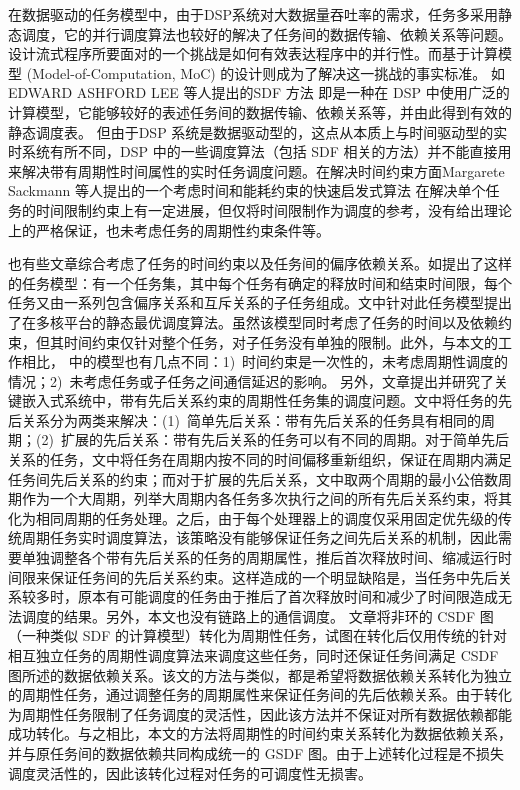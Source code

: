 在数据驱动的任务模型中，由于DSP系统对大数据量吞吐率的需求，任务多采用静态调度，它的并行调度算法也较好的解决了任务间的数据传输、依赖关系等问题。设计流式程序所要面对的一个挑战是如何有效表达程序中的并行性。而基于计算模型 (Model-of-Computation, MoC) 的设计则成为了解决这一挑战的事实标准。%
如EDWARD ASHFORD LEE 等人提出的SDF 方法 即是一种在 DSP 中使用广泛的计算模型，它能够较好的表述任务间的数据传输、依赖关系等，并由此得到有效的静态调度表。 但由于DSP 系统是数据驱动型的，这点从本质上与时间驱动型的实时系统有所不同，DSP 中的一些调度算法（包括 SDF 相关的方法）并不能直接用来解决带有周期性时间属性的实时任务调度问题。在解决时间约束方面Margarete Sackmann 等人提出的一个考虑时间和能耗约束的快速启发式算法 在解决单个任务的时间限制约束上有一定进展，但仅将时间限制作为调度的参考，没有给出理论上的严格保证，也未考虑任务的周期性约束条件等。

也有些文章综合考虑了任务的时间约束以及任务间的偏序依赖关系。如\cite{Xujia1993}提出了这样的任务模型：有一个任务集，其中每个任务有确定的释放时间和结束时间限，每个任务又由一系列包含偏序关系和互斥关系的子任务组成。文中针对此任务模型提出了在多核平台的静态最优调度算法。虽然该模型同时考虑了任务的时间以及依赖约束，但其时间约束仅针对整个任务，对子任务没有单独的限制。此外，与本文的工作相比，\cite{Xujia1993} 中的模型也有几点不同：1)~时间约束是一次性的，未考虑周期性调度的情况；2)~未考虑任务或子任务之间通信延迟的影响。
另外，文章\cite{Without}提出并研究了关键嵌入式系统中，带有先后关系约束的周期性任务集的调度问题。文中将任务的先后关系分为两类来解决：(1)~简单先后关系：带有先后关系的任务具有相同的周期；(2)~扩展的先后关系：带有先后关系的任务可以有不同的周期。对于简单先后关系的任务，文中将任务在周期内按不同的时间偏移重新组织，保证在周期内满足任务间先后关系的约束；而对于扩展的先后关系，文中取两个周期的最小公倍数周期作为一个大周期，列举大周期内各任务多次执行之间的所有先后关系约束，将其化为相同周期的任务处理。之后，由于每个处理器上的调度仅采用固定优先级的传统周期任务实时调度算法，该策略没有能够保证任务之间先后关系的机制，因此需要单独调整各个带有先后关系的任务的周期属性，推后首次释放时间、缩减运行时间限来保证任务间的先后关系约束。这样造成的一个明显缺陷是，当任务中先后关系较多时，原本有可能调度的任务由于推后了首次释放时间和减少了时间限造成无法调度的结果。另外，本文也没有链路上的通信调度。
文章\cite{HRTSCSDF}将非环的 CSDF 图（一种类似 SDF 的计算模型）转化为周期性任务，试图在转化后仅用传统的针对相互独立任务的周期性调度算法来调度这些任务，同时还保证任务间满足 CSDF 图所述的数据依赖关系。该文的方法与\cite{Without}类似，都是希望将数据依赖关系转化为独立的周期性任务，通过调整任务的周期属性来保证任务间的先后依赖关系。由于转化为周期性任务限制了任务调度的灵活性，因此该方法并不保证对所有数据依赖都能成功转化。与之相比，本文的方法将周期性的时间约束关系转化为数据依赖关系，并与原任务间的数据依赖共同构成统一的 GSDF 图。由于上述转化过程是不损失调度灵活性的，因此该转化过程对任务的可调度性无损害。

